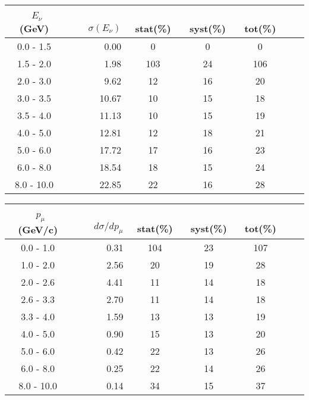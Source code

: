 \documentclass[aps, prd, reprint,showpacs,  preprintnumbers,amsmath,amssymb,superscriptaddress, nofootinbib]{revtex4-1}
\makeatletter
\renewenvironment{table}
  {\def\@captype{table}}
  {}
\makeatother
\begin{document}
\begin{table}
\centering
\begin{tabular}{crccccc}
\hline
~$E_{\nu}$ (GeV) &~~~ $\sigma (E_\nu)$ &~ stat(\%) &~ syst(\%) &~ tot(\%)  \\
\hline
 0.0 -  1.5 &   0.00 & 0 & 0 & 0 \\ 
 1.5 -  2.0 &   1.98 & 103 & 24 & 106 \\ 
 2.0 -  3.0 &   9.62 & 12 & 16 & 20 \\ 
 3.0 -  3.5 &  10.67 & 10 & 15 & 18 \\ 
 3.5 -  4.0 &  11.13 & 10 & 15 & 19 \\ 
 4.0 -  5.0 &  12.81 & 12 & 18 & 21 \\ 
 5.0 -  6.0 &  17.72 & 17 & 16 & 23 \\ 
 6.0 -  8.0 &  18.54 & 18 & 15 & 24 \\ 
 8.0 - 10.0 &  22.85 & 22 & 16 & 28 \\ 
\hline
\hline
\end{tabular}
\caption{ Total cross section in neutrino energy $E_\nu$, $\sigma (E_\nu)(10^{-40}\text{cm}^2/\text{nucleon})$, 
for 1$\pi^0$ production with statistical (stat), systematic (syst), and total (tot) uncertainties.}
\label{tb:pi0Enu}
\end{table}
\vspace{1cm}


\begin{table}
\centering
\begin{tabular}{crccccc}
\hline
~$p_{\mu}$ (GeV/c) &~~~ $d\sigma/dp_{\mu}$ &~ stat(\%) &~ syst(\%) &~ tot(\%)  \\
\hline
 0.0 -  1.0 &  0.31  & 104 & 23 & 107 \\ 
 1.0 -  2.0 &  2.56  & 20 & 19 & 28 \\ 
 2.0 -  2.6 &  4.41  & 11 & 14 & 18 \\ 
 2.6 -  3.3 &  2.70  & 11 & 14 & 18 \\ 
 3.3 -  4.0 &  1.59  & 13 & 13 & 19 \\ 
 4.0 -  5.0 &  0.90  & 15 & 13 & 20 \\ 
 5.0 -  6.0 &  0.42  & 22 & 13 & 26 \\ 
 6.0 -  8.0 &  0.25  & 22 & 14 & 26 \\ 
 8.0 - 10.0 &  0.14  & 34 & 15 & 37 \\ 
\hline
\hline
\end{tabular}
\caption{ Flux-averaged differential cross section in muon momentum 
$p_\mu$, $d\sigma/dp_{\mu}(10^{-40}\text{cm}^2/\text{nucleon}/(\text{GeV/c}))$, 
for 1$\pi^0$ production with statistical (stat), systematic (syst), and total (tot) uncertainties.}
\label{tb:pi0mup}
\end{table}
\end{document}

